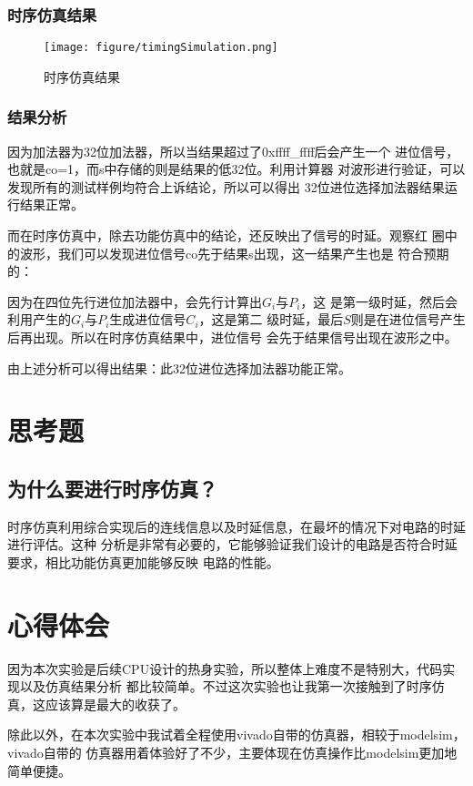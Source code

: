 \documentclass{../source/zjureport}
\begin{document}
            \subsubsection{时序仿真结果}
                \begin{figure}[!htp]
                    \centering
                    \texttt{[image: figure/timingSimulation.png]}
                    \caption{时序仿真结果}
                \end{figure}
            \subsubsection{结果分析}
                因为加法器为32位加法器，所以当结果超过了0xffff_ffff后会产生一个
                进位信号，也就是co=1，而s中存储的则是结果的低32位。利用计算器
                对波形进行验证，可以发现所有的测试样例均符合上诉结论，所以可以得出
                32位进位选择加法器结果运行结果正常。

                而在时序仿真中，除去功能仿真中的结论，还反映出了信号的时延。观察红
                圈中的波形，我们可以发现进位信号co先于结果s出现，这一结果产生也是
                符合预期的：
                
                因为在四位先行进位加法器中，会先行计算出$G_i$与$P_i$，这
                是第一级时延，然后会利用产生的$G_i$与$P_i$生成进位信号$C_i$，这是第二
                级时延，最后$S$则是在进位信号产生后再出现。所以在时序仿真结果中，进位信号
                会先于结果信号出现在波形之中。

                由上述分析可以得出结果：此32位进位选择加法器功能正常。

    \section{思考题}
        \subsection{为什么要进行时序仿真？}
        时序仿真利用综合实现后的连线信息以及时延信息，在最坏的情况下对电路的时延进行评估。这种
        分析是非常有必要的，它能够验证我们设计的电路是否符合时延要求，相比功能仿真更加能够反映
        电路的性能。

    \section{心得体会}
        因为本次实验是后续CPU设计的热身实验，所以整体上难度不是特别大，代码实现以及仿真结果分析
        都比较简单。不过这次实验也让我第一次接触到了时序仿真，这应该算是最大的收获了。

        除此以外，在本次实验中我试着全程使用vivado自带的仿真器，相较于modelsim，vivado自带的
        仿真器用着体验好了不少，主要体现在仿真操作比modelsim更加地简单便捷。
\end{document}
